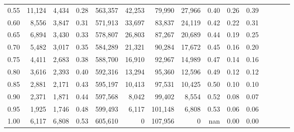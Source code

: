 \begin{tabular}{rrrcrrrrrrrrrrr}
0.55 &  11,124 &  4,434 &                                       0.28 &  563,357 &   42,253 &   79,990 &   27,966 &  0.40 &  0.26 &                         0.39 \\
0.60 &   8,556 &  3,847 &                                       0.31 &  571,913 &   33,697 &   83,837 &   24,119 &  0.42 &  0.22 &                         0.31 \\
0.65 &   6,894 &  3,430 &                                       0.33 &  578,807 &   26,803 &   87,267 &   20,689 &  0.44 &  0.19 &                         0.25 \\
0.70 &   5,482 &  3,017 &                                       0.35 &  584,289 &   21,321 &   90,284 &   17,672 &  0.45 &  0.16 &                         0.20 \\
0.75 &   4,411 &  2,683 &                                       0.38 &  588,700 &   16,910 &   92,967 &   14,989 &  0.47 &  0.14 &                         0.16 \\
0.80 &   3,616 &  2,393 &                                       0.40 &  592,316 &   13,294 &   95,360 &   12,596 &  0.49 &  0.12 &                         0.12 \\
0.85 &   2,881 &  2,171 &                                       0.43 &  595,197 &   10,413 &   97,531 &   10,425 &  0.50 &  0.10 &                         0.10 \\
0.90 &   2,371 &  1,871 &                                       0.44 &  597,568 &    8,042 &   99,402 &    8,554 &  0.52 &  0.08 &                         0.07 \\
0.95 &   1,925 &  1,746 &                                       0.48 &  599,493 &    6,117 &  101,148 &    6,808 &  0.53 &  0.06 &                         0.06 \\
1.00 &   6,117 &  6,808 &                                       0.53 &  605,610 &        0 &  107,956 &        0 &   nan &  0.00 &                         0.00 \\
\bottomrule
\end{tabular}
